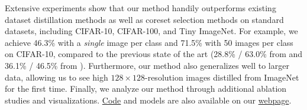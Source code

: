 \documentclass[main.tex]{subfiles}
\begin{document}
Extensive experiments show that our method handily outperforms existing dataset distillation methods as well as coreset selection methods on standard datasets, including CIFAR-10, CIFAR-100, and Tiny ImageNet. For example, we achieve 46.3\% with a \emph{single} image per class and 71.5\% with 50 images per class on CIFAR-10, compared to the previous state of the art (28.8\% / 63.0\% from \cite{dsa, dm} and 36.1\% / 46.5\% from \cite{nguyen2021dataset}).
Furthermore, our method also generalizes well to larger data, allowing us to see high $128\times128$-resolution images distilled from ImageNet \cite{deng2009imagenet} for the first time. Finally, we analyze our method through additional ablation studies and visualizations. %
\href{https://github.com/GeorgeCazenavette/mtt-distillation}{Code} and models are also available on our \href{https://georgecazenavette.github.io/mtt-distillation/}{webpage}.
\end{document}
